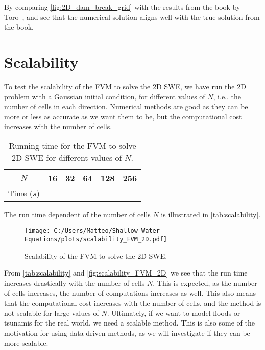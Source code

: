 By comparing \autoref{fig:2D_dam_break_grid} with the results from the book by Toro~\cite{Toro2024}, and see that the numerical solution aligns well with the true solution from the book.

\section{Scalability}
To test the scalability of the FVM to solve the 2D SWE, we have run the 2D problem with a Gaussian initial condition, for different values of $N$, i.e., the number of cells in each direction.
Numerical methods are good as they can be more or less as accurate as we want them to be, but the computational cost increases with the number of cells.

\begin{table}[H]
    \centering
    \begin{tabular}{c|ccccc}
        \hline
        $N$ & 16 & 32 & 64 & 128 & 256 \\
        \hline 
        Time ($s$) & 
         &
         &
         &
         &
        
        \\
        \hline
    \end{tabular}
    \caption{Running time for the FVM to solve 2D SWE for different values of $N$.}\label{tab:scalability}
\end{table}

The run time dependent of the number of cells $N$ is illustrated in \autoref{tab:scalability}.
\begin{figure}[H]
    \centering
    \texttt{[image: C:/Users/Matteo/Shallow-Water-Equations/plots/scalability\_FVM\_2D.pdf]}
    \caption{Scalability of the FVM to solve the 2D SWE.}\label{fig:scalability_FVM_2D}
\end{figure}
From \autoref{tab:scalability} and \autoref{fig:scalability_FVM_2D} we see that the run time increases drastically with the number of cells $N$.
This is expected, as the number of cells increases, the number of computations increases as well.
This also means that the computational cost increases with the number of cells, and the method is not scalable for large values of $N$.
Ultimately, if we want to model floods or tsunamis for the real world, we need a scalable method.
This is also some of the motivation for using data-driven methods, as we will investigate if they can be more scalable.

